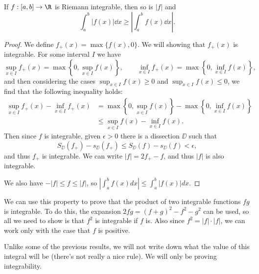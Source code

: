 \documentclass[a4paper]{scrartcl}
\begin{document}
\begin{proposition}
	If $f :[a, b] \rightarrow \R$ is Riemann integrable, then so is $|f|$ and
	$$
	\int_a^b |f(x) | \dd x \geq \left|\int_a^b f(x) \dd x\right|.
	$$
\end{proposition}
\begin{proof}
	We define $f_+(x) = \max\{f(x), 0\}$. We will showing that $f_+(x)$ is integrable. For some interval $I$ we have
	$$
	\sup_{x \in I} f_+(x) = \max\left\{0, \sup_{x \in I} f(x)\right\}, \quad \quad \inf_{x \in I} f_+(x) = \max\left\{0, \inf_{x \in I} f(x)\right\},
	$$
	and then considering the cases $\sup_{x \in I}f(x) \geq 0$ and $\sup_{x \in I}f(x) \leq 0$, we find that the following inequality holds:
	\begin{align*}
	\sup_{x \in I} f_+(x) - \inf_{x \in I} f_+(x) &= \max\left\{0, \sup_{x \in I} f(x)\right\} - \max\left\{0, \inf_{x \in I} f(x)\right\}  \\
	& \leq \sup_{x \in I} f(x) - \inf_{x \in I} f(x).
\end{align*}
Then since $f$ is integrable, given $\epsilon > 0$ there is a dissection $\DD$ such that
$$
S_{\DD}(f_+) - s_{\DD}(f_+) \leq S_{\DD}(f) - s_{\DD}(f) < \epsilon,
$$
and thus $f_+$ is integrable. We can write $|f| = 2f_+ - f$, and thus $|f|$ is also integrable.

We also have $-|f| \leq f \leq |f|$, so $\left|\int_{a}^{b} f(x) d x\right| \leq \int_{a}^{b}|f(x)| d x$.
\end{proof}

We can use this property to prove that the product of two integrable functions $fg$ is integrable. To do this, the expansion $2fg = (f + g)^2 - f^2 - g^2$ can be used, so all we need to show is that $f^2$ is integrable if $f$ is. Also since $f^2 = |f| \cdot |f|$, we can work only with the case that $f$ is positive.

Unlike some of the previous results, we will not write down what the value of this integral will be (there's not really a nice rule). We will only be proving integrability.
\end{document}
